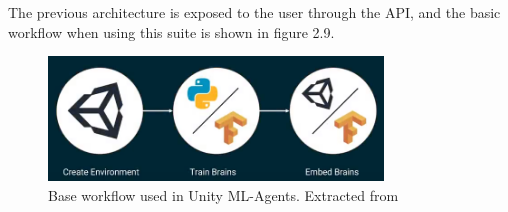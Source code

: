     The previous architecture is exposed to the user through the API, and the basic workflow when using
    this suite is shown in figure 2.9.

    \begin{figure}[!ht]
        \centering
        \includegraphics[width=3.5in]{./chapters/imgs/img_unity_mlagents_workflow.png}
        \caption[unity ml agents workflow]{Base workflow used in Unity ML-Agents. Extracted from \citet{unity-ml-agents}}
        \label{fig:unity-ml-agents-workflow}
    \end{figure}